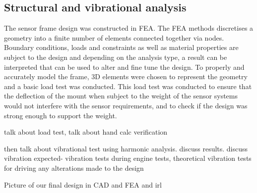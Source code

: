 \documentclass[main.tex]{subfiles}
\begin{document}
\subsection{Structural and vibrational analysis}
The sensor frame design was constructed in FEA. The FEA methods discretises a geometry into a finite number of elements connected together via nodes. Boundary conditions, loads and constraints as well as material properties are subject to the design and depending on the analysis type, a result can be interpreted that can be used to alter and fine tune the design.  To properly and accurately model the frame, 3D elements were chosen to represent the geometry and a basic load test was conducted. This load test was conducted to ensure that the deflection of the mount when subject to the weight of the sensor systems would not interfere with the sensor requirements, and to check if the design was strong enough to support the weight. 

talk about load test, talk about hand calc verification

then talk about vibrational test using harmonic analysis. discuss results. discuss vibration expected- vibration tests during engine tests, theoretical vibration tests for driving
any alterations made to the design

Picture of our final design in CAD and FEA and irl
\end{document}
